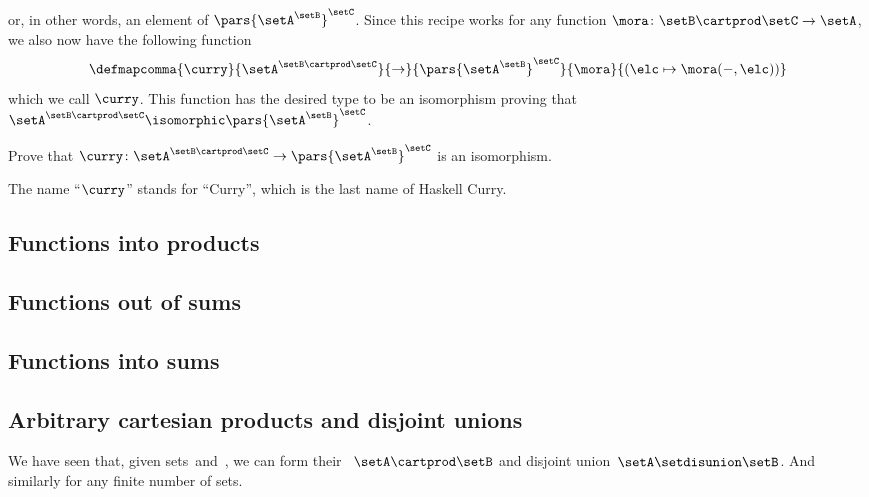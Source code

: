 or, in other words, an element of $\pars{\setA^\setB}^\setC$. Since this recipe works for any function $\mora \colon \setB \cartprod \setC \to \setA$, we also now have the following function
\begin{equation}
\defmapcomma{
         \curry
        }{
           \setA^{\setB \cartprod \setC}
        }{
           \to
        }{
           \pars{\setA^\setB}^\setC 
        }{
           \mora
        }{
           (\elc \mapsto \mora ( -, \elc))
           }
\end{equation}
which we call $\curry$. This function has the desired type to be an isomorphism proving that $\setA^{\setB \cartprod \setC}  \isomorphic \pars{\setA^\setB}^\setC$.

\begin{exercise}\label{ex:currying-is-an-iso}
Prove that  $\curry \colon \setA^{\setB \cartprod \setC} \to \pars{\setA^\setB}^\setC$ is an isomorphism. 
\end{exercise}

The name ``$\curry$'' stands for ``Curry'', which is the last name of Haskell Curry. 

\begin{solution}
\todotext{JL: write up
\end{solution}


\subsection{Functions into products}


\subsection{Functions out of sums}


\subsection{Functions into sums}



\subsection{Arbitrary cartesian products and disjoint unions}

We have seen that, given sets~\setA and~\setB, we can form their ~$\setA \cartprod \setB$ and disjoint union~$\setA \setdisunion \setB$.
And similarly for any finite number of sets.


